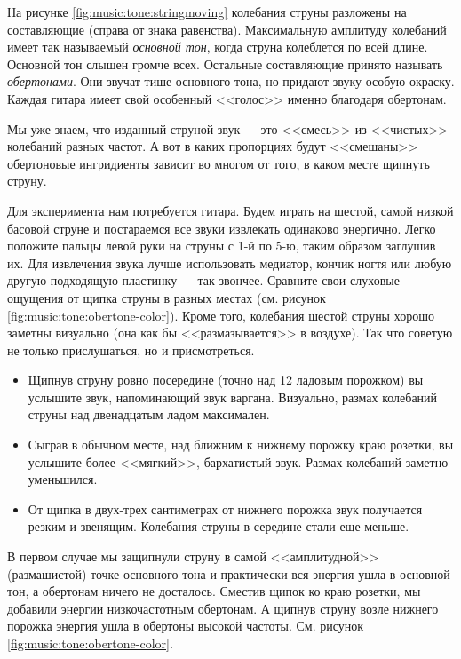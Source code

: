 На рисунке \ref{fig:music:tone:stringmoving} колебания струны разложены на составляющие (справа от знака равенства). Максимальную амплитуду колебаний имеет так называемый \emph{основной тон}, когда струна колеблется по всей длине. Основной тон слышен громче всех. Остальные составляющие принято называть \emph{обертонами}. Они звучат тише основного тона, но придают звуку особую окраску. Каждая гитара имеет свой особенный <<голос>> именно благодаря обертонам.

\begin{Example}
    Мы уже знаем, что изданный струной звук --- это <<смесь>> из <<чистых>> колебаний разных частот. А вот в каких пропорциях будут <<смешаны>> обертоновые ингридиенты зависит во многом от того, в каком месте щипнуть струну.
    
    Для эксперимента нам потребуется гитара. Будем играть на шестой, самой низкой басовой струне и постараемся все звуки извлекать одинаково энергично. Легко положите пальцы левой руки на струны с 1-й по 5-ю, таким образом заглушив их. Для извлечения звука лучше использовать медиатор, кончик ногтя или любую другую подходящую пластинку --- так звончее. Сравните свои слуховые ощущения от щипка струны в разных местах (см. рисунок \ref{fig:music:tone:obertone-color}). Кроме того, колебания шестой струны хорошо заметны визуально (она как бы <<размазывается>> в воздухе). Так что советую не только прислушаться, но и присмотреться.
    \begin{itemize}
        \item Щипнув струну ровно посередине (точно над 12 ладовым порожком) вы услышите звук, напоминающий звук варгана. Визуально, размах колебаний струны над двенадцатым ладом максимален.
        \item Сыграв в обычном месте, над ближним к нижнему порожку краю розетки, вы услышите более <<мягкий>>, бархатистый звук. Размах колебаний заметно уменьшился.
        \item От щипка в двух-трех сантиметрах от нижнего порожка звук получается резким и звенящим. Колебания струны в середине стали еще меньше.
    \end{itemize}
    
    В первом случае мы защипнули струну в самой <<амплитудной>> (размашистой) точке основного тона и практически вся энергия ушла в основной тон, а обертонам ничего не досталось. Сместив щипок ко краю розетки, мы добавили энергии низкочастотным обертонам. А щипнув струну возле нижнего порожка энергия ушла в обертоны высокой частоты. См. рисунок \ref{fig:music:tone:obertone-color}.
    

\end{Example}
